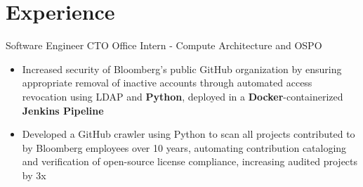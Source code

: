 \documentclass[letterpaper,11pt]{article}
\begin{document}
\section{Experience}
{Software Engineer}{}
{CTO Office Intern - Compute Architecture and OSPO}{}
\begin{itemize}[leftmargin=*]
    \item \vspace{-3pt} \small Increased security of Bloomberg's public GitHub
          organization by ensuring appropriate removal of inactive accounts
          through automated access revocation using LDAP and
          \textbf{Python}, deployed in a \textbf{Docker}-containerized
          \textbf{Jenkins Pipeline}
    \item \vspace{-7pt} \small Developed a GitHub crawler using Python to scan
          all projects contributed to by Bloomberg employees over 10 years,
          automating contribution cataloging and
          verification of open-source license compliance,
          increasing audited projects by 3x
\end{itemize}

\end{document}

